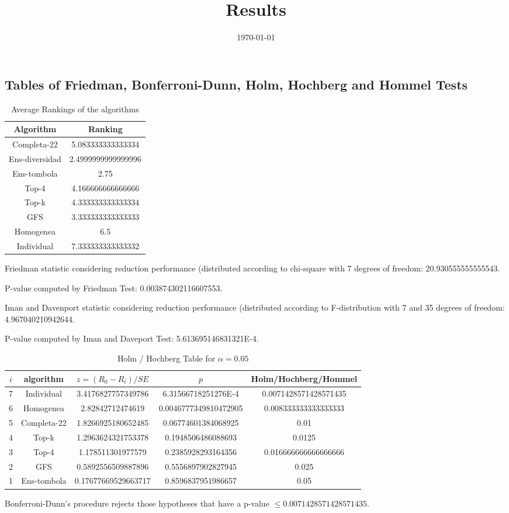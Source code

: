 \documentclass[a4paper,10pt]{article}
\title{Results}
\author{}
\date{\today}
\begin{document}
\begin{landscape}
\oddsidemargin 0in \topmargin 0in\maketitle
\section{Tables of Friedman, Bonferroni-Dunn, Holm, Hochberg and Hommel Tests}
\begin{table}[!htp]
\centering
\caption{Average Rankings of the algorithms
}\begin{tabular}{c|c}
Algorithm&Ranking\\
\hline
Completa-22&5.083333333333334\\
Ens-diversidad&2.4999999999999996\\
Ens-tombola&2.75\\
Top-4&4.166666666666666\\
Top-k&4.333333333333334\\
GFS&3.333333333333333\\
Homogenea&6.5\\
Individual&7.333333333333332\\
\end{tabular}
\end{table}


Friedman statistic considering reduction performance (distributed according to chi-square with 7 degrees of freedom: 20.930555555555543.


P-value computed by Friedman Test: 0.003874302116607553.\newline

Iman and Davenport statistic considering reduction performance (distributed according to F-distribution with 7 and 35 degrees of freedom: 4.967040210942644.


P-value computed by Iman and Daveport Test: 5.613695146831321E-4.\newline

\begin{table}[!htp]
\centering\tiny
\caption{Holm / Hochberg Table for $\alpha=0.05$}
\begin{tabular}{ccccc}
$i$&algorithm&$z=(R_0 - R_i)/SE$&$p$&Holm/Hochberg/Hommel\\
\hline
7&Individual&3.4176827757349786&6.31566718251276E-4&0.0071428571428571435\\
6&Homogenea&2.82842712474619&0.0046777349810472905&0.008333333333333333\\
5&Completa-22&1.8266925180652485&0.06774601384068925&0.01\\
4&Top-k&1.2963624321753378&0.1948506486088693&0.0125\\
3&Top-4&1.178511301977579&0.2385928293164356&0.016666666666666666\\
2&GFS&0.5892556509887896&0.5556897902827945&0.025\\
1&Ens-tombola&0.17677669529663717&0.8596837951986657&0.05\\
\hline
\end{tabular}
\end{table}
Bonferroni-Dunn's procedure rejects those hypotheses that have a p-value $\le0.0071428571428571435$.



\end{landscape}
\end{document}

